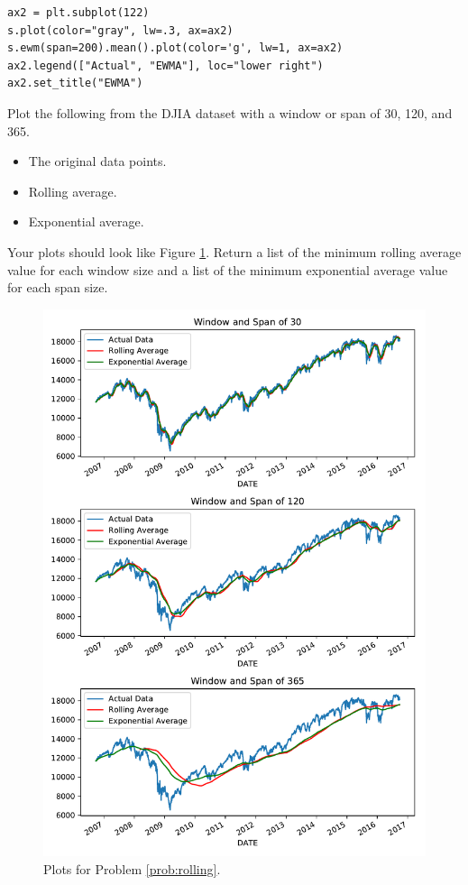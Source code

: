\begin{lstlisting}
ax2 = plt.subplot(122)
s.plot(color="gray", lw=.3, ax=ax2)
s.ewm(span=200).mean().plot(color='g', lw=1, ax=ax2)
ax2.legend(["Actual", "EWMA"], loc="lower right")
ax2.set_title("EWMA")
\end{lstlisting}

\begin{problem}
Plot the following from the DJIA dataset with a window or span of 30, 120, and 365.
\begin{itemize}
    \item The original data points.
    \item Rolling average.
    \item Exponential average.
\end{itemize}
Your plots should look like Figure \ref{fig:prob6}.
Return a list of the minimum rolling average value for each window size and a list of the minimum exponential average value for each span size.
\label{prob:rolling}
\end{problem}

\begin{figure}[h]
\includegraphics[width=\textwidth]{figures/prob6.pdf}
\caption{Plots for Problem \ref{prob:rolling}.}
\label{fig:prob6}
\end{figure}
